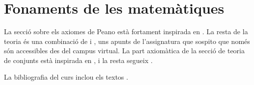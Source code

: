 \documentclass[../primer.tex]{subfiles}
\begin{document}
\part{Fonaments de les matemàtiques}



\printbibliography
La secció sobre els axiomes de Peano està fortament inspirada en \cite{notesKumar}.
La resta de la teoria és una combinació de \cite{AntoineRosaCampsMoncasiIntroduccioAlgebraAbstracta} i \cite{TemesFonaments}, uns apunts de l'assignatura que sospito que només són accessibles des del campus virtual.
La part axiomàtica de la secció de teoria de conjunts està inspirada en \cite{ACTEAguade}, i la resta segueix \cite{TemesFonaments}.

La bibliografia del curs inclou els textos \cite{AntoineRosaCampsMoncasiIntroduccioAlgebraAbstracta, CastelletLlerenaAlgebraLinealIGeometria, GodementAlgebra, NutsAndBoltsOfProofs, BujalanceBujalanceCostaProblemasMatematicaDiscreta, IntroductionToMathematicalReasoning, ChapterZeroSchumacher}.
\end{document}
